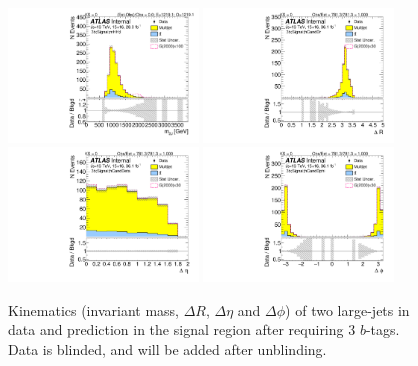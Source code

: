 \begin{figure}[htbp!]
\begin{center}
\includegraphics[width=0.45\textwidth,angle=-90]{figures/boosted/Signal/b77_ThreeTag_Signal_mHH_l_blind.pdf}
\includegraphics[width=0.45\textwidth,angle=-90]{figures/boosted/Signal/b77_ThreeTag_Signal_hCandDr_blind.pdf}\\
\includegraphics[width=0.45\textwidth,angle=-90]{figures/boosted/Signal/b77_ThreeTag_Signal_hCandDeta_blind.pdf}
\includegraphics[width=0.45\textwidth,angle=-90]{figures/boosted/Signal/b77_ThreeTag_Signal_hCandDphi_blind.pdf}
  \caption{Kinematics (invariant mass, $\Delta R$, $\Delta \eta$ and $\Delta \phi$) of two large-\R jets in data and prediction in the signal region after requiring 3 $b$-tags. Data is blinded, and will be added after unblinding. }
  \label{fig:boosted-3b-signal-blind-ak10-system}
\end{center}
\end{figure}

